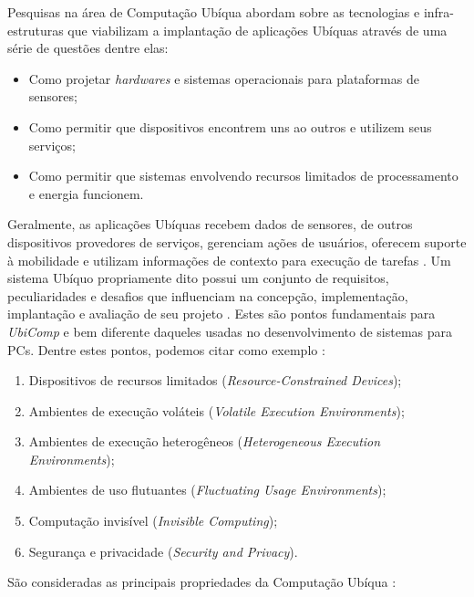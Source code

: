Pesquisas na área de Computação Ubíqua abordam sobre as tecnologias e infra-estruturas que viabilizam a implantação de aplicações Ubíquas através de uma série de questões dentre elas:

 \begin{itemize}
   \item Como projetar \textit{hardwares} e sistemas operacionais para plataformas de sensores;
   \item Como permitir que dispositivos encontrem uns ao outros e utilizem seus serviços;
   \item Como permitir que sistemas envolvendo recursos limitados de processamento e energia funcionem.
 \end{itemize}
 
 Geralmente, as aplicações Ubíquas recebem dados de sensores, de outros dispositivos provedores de serviços, gerenciam ações de usuários, oferecem suporte à mobilidade e utilizam informações de contexto para execução de tarefas \cite{doesntfit}. Um sistema Ubíquo propriamente dito possui um conjunto de requisitos, peculiaridades e desafios que influenciam na concepção, implementação, implantação e avaliação de seu projeto \cite{krumm2009}. Estes são pontos fundamentais para \textit{UbiComp} e bem diferente daqueles usadas no desenvolvimento de sistemas para PCs. Dentre estes pontos, podemos citar como exemplo \cite{krumm2009}: 
 
 \begin{enumerate}
   \item Dispositivos de recursos limitados (\textit{Resource-Constrained Devices});	
   \item Ambientes de execução voláteis (\textit{Volatile Execution Environments});	
   \item Ambientes de execução heterogêneos (\textit{Heterogeneous Execution Environments});
   \item Ambientes de uso flutuantes (\textit{Fluctuating Usage Environments});
   \item Computação invisível (\textit{Invisible Computing});
   \item Segurança e privacidade (\textit{Security and Privacy}). 
 \end{enumerate}


São consideradas as principais propriedades da Computação Ubíqua \cite{lyytinen2002ubiquitous}:

